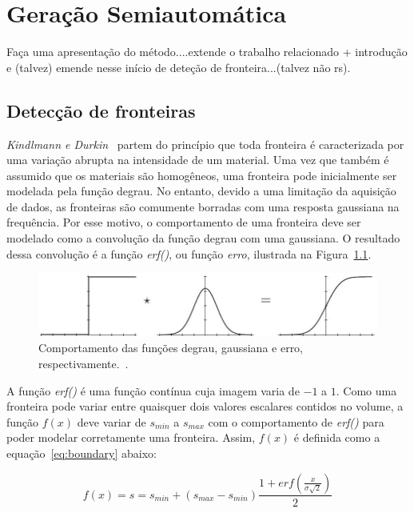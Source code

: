 
\chapter{Geração Semiautomática}
\label{gordon}

	Faça uma apresentação do método....extende o trabalho relacionado + introdução e (talvez) emende nesse início de deteção de fronteira...(talvez não rs).
\section{Detecção de fronteiras}
\label{gordon.bound}
	\textit{Kindlmann e Durkin}~\cite{gordon} partem do princípio que toda fronteira é caracterizada por uma variação abrupta na intensidade de um material. Uma vez que também é assumido que os materiais são homogêneos, uma fronteira pode inicialmente ser modelada pela função degrau. No entanto, devido a uma limitação da aquisição de dados, as fronteiras são comumente borradas com uma resposta gaussiana na frequência. Por esse motivo, o comportamento de uma fronteira deve ser modelado como a convolução da função degrau com uma gaussiana. O resultado dessa convolução é a função \textit{erf()}, ou função \textit{erro}, ilustrada na Figura~\ref{fig:boundary_model}.
	
\begin{figure}[h]
	\centering
	\includegraphics[width=1\textwidth]{images/g_boundary_model}
	\caption{Comportamento das funções degrau, gaussiana e erro, respectivamente.~\cite{gordon}.}
	\label{fig:boundary_model}
\end{figure}

	A função \textit{erf()} é uma função contínua cuja imagem varia de $-1$ a $1$. Como uma fronteira pode variar entre quaisquer dois valores escalares contidos no volume, a função $f(x)$ deve variar de $s_{min}$ a $s_{max}$ com o comportamento de \textit{erf()} para poder modelar corretamente uma fronteira. Assim, $f(x)$ é definida como a equação~\eqref{eq:boundary} abaixo:

\begin{equation} \label{eq:boundary}
	f(x) = s = s_{min} + (s_{max} - s_{min}) \frac{1 + erf(\frac{x}{\sigma\sqrt{2}})}{2}
\end{equation}
	
